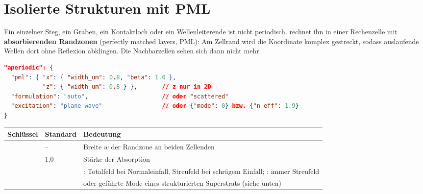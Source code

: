 \section{Isolierte Strukturen mit PML}\label{sec:pml}
%
Ein einzelner Steg, ein Graben, ein Kontaktloch oder ein Wellenleiterende ist nicht periodisch. \FG{} rechnet ihn in
einer Rechenzelle mit \textbf{absorbierenden Randzonen} (perfectly matched layers, PML): Am Zellrand wird die
Koordinate komplex gestreckt, sodass auslaufende Wellen dort ohne Reflexion abklingen. Die Nachbarzellen sehen sich
dann nicht mehr.
\begin{center}
\end{center}
\begin{lstlisting}[language=json]
"aperiodic": {
  "pml": { "x": { "width_um": 0.8, "beta": 1.0 },
           "z": { "width_um": 0.8 } },       // z nur in 2D
  "formulation": "auto",                     // oder "scattered"
  "excitation": "plane_wave"                 // oder {"mode": 0} bzw. {"n_eff": 1.9}
}
\end{lstlisting}
\begin{center}
\small
\begin{tabularx}{\linewidth}{llY}
\toprule
Schlüssel & Standard & Bedeutung \\
\midrule
{} & -- & Breite $w$ der Randzone an beiden Zellenden \\
 & 1,0 & Stärke der Absorption \\
 &  & : Totalfeld bei Normaleinfall, Streufeld bei schrägem Einfall;
: immer Streufeld \\
 &  & oder geführte Mode eines strukturierten Superstrats (siehe unten) \\
\bottomrule
\end{tabularx}
\end{center}
